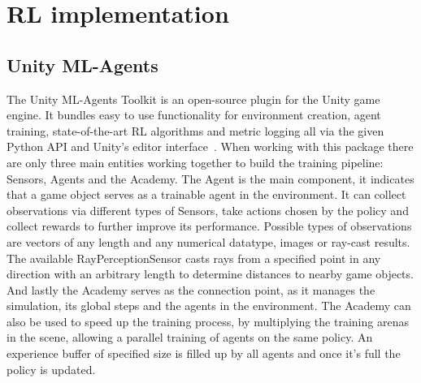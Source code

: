 

\section{RL implementation}\label{sec:rl-implementation}

\subsection{Unity ML-Agents}\label{subsec:unity-ml-agents}
The Unity ML-Agents Toolkit is an open-source plugin for the Unity game engine.
It bundles easy to use functionality for environment creation, agent training, state-of-the-art RL algorithms and metric logging
all via the given Python API and Unity's editor interface~\cite{juliani2020}.
When working with this package there are only three main entities working together to build the training pipeline: Sensors, Agents and the Academy.
The Agent is the main component, it indicates that a game object serves as a trainable agent in the environment.
It can collect observations via different types of Sensors, take actions chosen by the policy and collect rewards to further improve its performance.
Possible types of observations are vectors of any length and any numerical datatype, images or ray-cast results.
The available RayPerceptionSensor casts rays from a specified point in any direction with an arbitrary length to determine distances to nearby game objects.
And lastly the Academy serves as the connection point, as it manages the simulation, its global steps and the agents in the environment.
The Academy can also be used to speed up the training process, by multiplying the training arenas in the scene, allowing a parallel training of agents on the same policy.
An experience buffer of specified size is filled up by all agents and once it's full the policy is updated.

